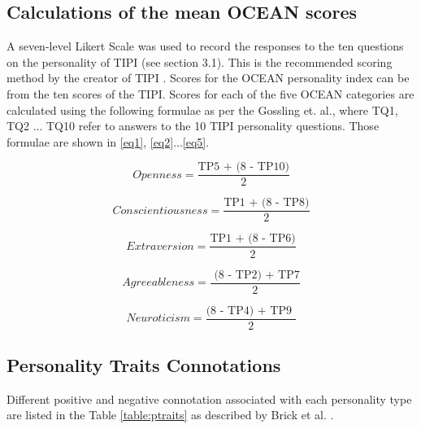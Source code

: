 \documentclass[conference]{IEEEtran}
\begin{document}



\subsection{Calculations of the mean OCEAN scores}\label{subsec2}

A seven-level Likert Scale \cite{joshi2015likert} was used to record the responses to the ten questions on the personality of TIPI (see section 3.1). This is the recommended scoring method by the creator of TIPI \cite{gosling2003very}.
Scores for the OCEAN personality index can be from the ten scores of the TIPI. Scores for each of the five OCEAN categories are calculated using the following formulae as per the Gossling et. al., where TQ1, TQ2 ... TQ10 refer to answers to the 10 TIPI personality questions. Those formulae are shown in \ref{eq1}, \ref{eq2}...\ref{eq5}.

\begin{equation}
Openness = \frac{\text{TP5 + (8 - TP10)}}{2}
\label{eq1}    
\end{equation}

\begin{equation}
Conscientiousness = \frac{\text{TP1 + (8 - TP8)}}{2} 
\label{eq2}    
\end{equation}

\begin{equation}
Extraversion = \frac{\text{TP1 + (8 - TP6)}}{2}
\label{eq3}    
\end{equation}

\begin{equation}
Agreeableness = \frac{\text{ (8 - TP2) + TP7}}{2}
\label{eq4}    
\end{equation}

\begin{equation}
Neuroticism = \frac{\text{(8 - TP4) + TP9 }}{2}
\label{eq5}    
\end{equation}

\iffalse
\subsection{Personality Traits Connotations}\label{subsec2}
Different positive and negative connotation associated with each personality type are listed in the Table \ref{table:ptraits} as described by Brick et al. \cite{bruck2003relationship}. 
\end{document}
